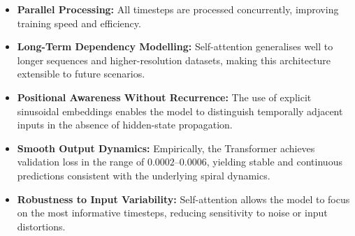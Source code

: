 \begin{itemize}
    \item \textbf{Parallel Processing:} All timesteps are processed concurrently, improving training speed and efficiency.
    
    \item \textbf{Long-Term Dependency Modelling:} Self-attention generalises well to longer sequences and higher-resolution datasets, making this architecture extensible to future scenarios.
    
    \item \textbf{Positional Awareness Without Recurrence:} The use of explicit sinusoidal embeddings enables the model to distinguish temporally adjacent inputs in the absence of hidden-state propagation.
    
    \item \textbf{Smooth Output Dynamics:} Empirically, the Transformer achieves validation loss in the range of $0.0002$–$0.0006$, yielding stable and continuous predictions consistent with the underlying spiral dynamics.
    
    \item \textbf{Robustness to Input Variability:} Self-attention allows the model to focus on the most informative timesteps, reducing sensitivity to noise or input distortions.
\end{itemize}
